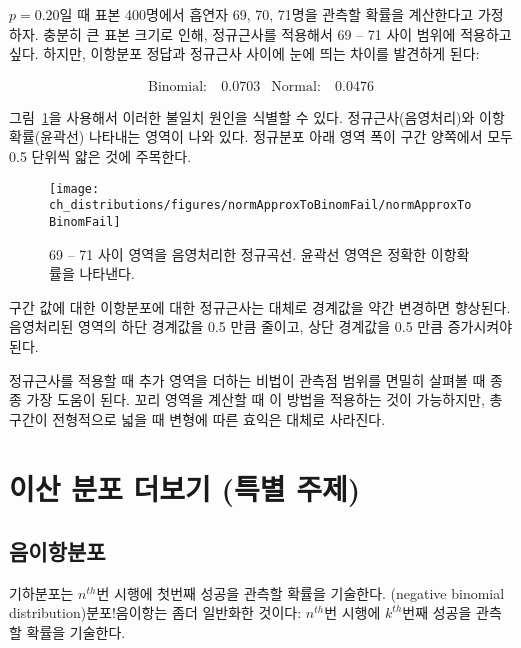 $p=0.20$일 때 표본 400명에서 흡연자 69, 70, 71명을 관측할 확률을 계산한다고 가정하자. 충분히 큰 표본 크기로 인해, 정규근사를 적용해서 69 -- 71 사이 범위에 적용하고 싶다. 하지만, 이항분포 정답과 정규근사 사이에 눈에 띄는 차이를 발견하게 된다:

\begin{align*}
\text{Binomial:}&\ 0.0703
&\text{Normal:}&\ 0.0476
\end{align*}

그림~\ref{normApproxToBinomFail}을 사용해서 이러한 불일치 원인을 식별할 수 있다. 정규근사(음영처리)와 이항확률(윤곽선) 나타내는 영역이 나와 있다. 정규분포 아래 영역 폭이 구간 양쪽에서 모두 0.5 단위씩 얇은 것에 주목한다.

\begin{figure}[h]
\centering
\texttt{[image: ch\_distributions/figures/normApproxToBinomFail/normApproxToBinomFail]}
\caption{
69 -- 71 사이 영역을 음영처리한 정규곡선. 윤곽선 영역은 정확한 이항확률을 나타낸다.}
\label{normApproxToBinomFail}
\end{figure}

\begin{tipBox}{
구간 값에 대한 이항분포에 대한 정규근사는 대체로 경계값을 약간 변경하면 향상된다. 음영처리된 영역의 하단 경계값을 0.5 만큼 줄이고, 상단 경계값을 0.5 만큼 증가시켜야 된다.}
\end{tipBox}

정규근사를 적용할 때 추가 영역을 더하는 비법이 관측점 범위를 면밀히 살펴볼 때 종종 가장 도움이 된다. 꼬리 영역을 계산할 때 이 방법을 적용하는 것이 가능하지만, 총구간이 전형적으로 넓을 때 변형에 따른 효익은 대체로 사라진다.




\section{이산 분포 더보기 (특별 주제)}
\label{discreteModels}

\subsection{음이항분포}
\label{negativeBinomial}

기하분포는 $n^{th}$번 시행에 첫번째 성공을 관측할 확률을 기술한다. (negative binomial distribution){분포!음이항}는 좀더 일반화한 것이다: $n^{th}$번 시행에 $k^{th}$번째 성공을 관측할 확률을 기술한다.

